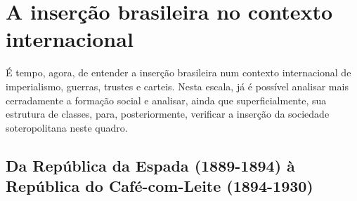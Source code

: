 \section{A inserção brasileira no contexto internacional}\label{sec:insbrascontint}

É tempo, agora, de entender a inserção brasileira num contexto internacional de imperialismo, guerras, trustes e carteis. Nesta escala, já é possível analisar mais cerradamente a formação social e analisar, ainda que superficialmente, sua estrutura de classes, para, posteriormente, verificar a inserção da sociedade soteropolitana neste quadro.

\subsection{Da República da Espada (1889-1894) à República do Café-com-Leite (1894-1930)}\label{subsec:espadaleite}

